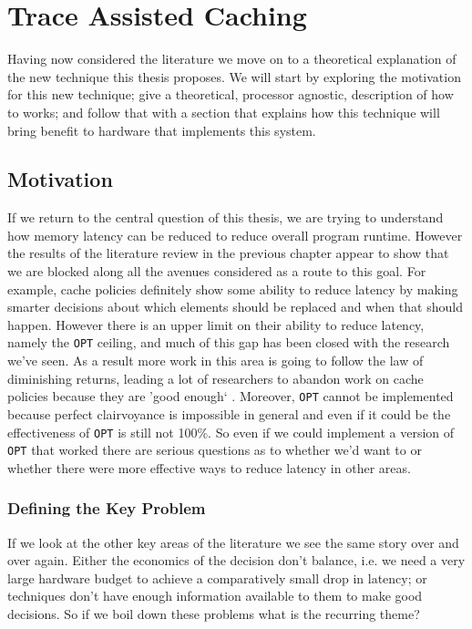 \chapter{Trace Assisted Caching}
\label{chap:trace-assisted-caching}

Having now considered the literature we move on to a theoretical explanation of the new technique this thesis proposes. We will start by exploring the motivation for this new technique; give a theoretical, processor agnostic, description of how to works; and follow that with a section that explains how this technique will bring benefit to hardware that implements this system.

\section{Motivation}

If we return to the central question of this thesis, we are trying to understand how memory latency can be reduced to reduce overall program runtime. However the results of the literature review in the previous chapter appear to show that we are blocked along all the avenues considered as a route to this goal. For example, cache policies definitely show some ability to reduce latency by making smarter decisions about which elements should be replaced and when that should happen. However there is an upper limit on their ability to reduce latency, namely the \texttt{OPT} ceiling, and much of this gap has been closed with the research we've seen. As a result more work in this area is going to follow the law of diminishing returns, leading a lot of researchers to abandon work on cache policies because they are 'good enough` \cite{podlipnigSurveyWebCache2003}. Moreover, \texttt{OPT} cannot be implemented because perfect clairvoyance is impossible in general and even if it could be the effectiveness of \texttt{OPT} is still not 100\%. So even if we could implement a version of \texttt{OPT} that worked there are serious questions as to whether we'd want to or whether there were more effective ways to reduce latency in other areas.

\subsection{Defining the Key Problem}

If we look at the other key areas of the literature we see the same story over and over again. Either the economics of the decision don't balance, i.e. we need a very large hardware budget to achieve a comparatively small drop in latency; or techniques don't have enough information available to them to make good decisions. So if we boil down these problems what is the recurring theme? 

